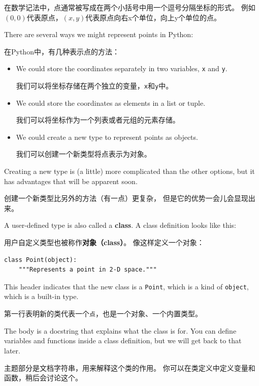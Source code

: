\documentclass[10pt]{book}
\begin{document}
\begin{CJK}{UTF8}{gbsn}
在数学记法中，点通常被写成在两个小括号中用一个逗号分隔坐标的形式。
例如$(0,0)$代表原点，$(x,y)$代表原点向右x个单位，向上y个单位的点。

There are several ways we might represent points in Python:

在Python中，有几种表示点的方法：

\begin{itemize}

\item We could store the coordinates separately in two
variables, {\tt x} and {\tt y}.

我们可以将坐标存储在两个独立的变量，{\tt x}和{\tt y}中。

\item We could store the coordinates as elements in a list
or tuple.

我们可以将坐标作为一个列表或者元组的元素存储。

\item We could create a new type to represent points as
objects.

我们可以创建一个新类型将点表示为对象。

\end{itemize}

Creating a new type
is (a little) more complicated than the other options, but
it has advantages that will be apparent soon.

创建一个新类型比另外的方法（有一点）更复杂，
但是它的优势一会儿会显现出来。

A user-defined type is also called a {\bf class}.
A class definition looks like this:

用户自定义类型也被称作{\bf 对象（class）}。
像这样定义一个对象：

\begin{verbatim}
class Point(object):
    """Represents a point in 2-D space."""
\end{verbatim}
%
This header indicates that the new class is a {\tt Point},
which is a kind of {\tt object}, which is a built-in
type.

第一行表明新的类代表一个{\tt 点}，也是一个对象、一个内置类型。

The body is a docstring that explains what the class is for.
You can define variables and functions inside a class definition,
but we will get back to that later.

主题部分是文档字符串，用来解释这个类的作用。
你可以在类定义中定义变量和函数，稍后会讨论这个。


\end{CJK}
\end{document}
